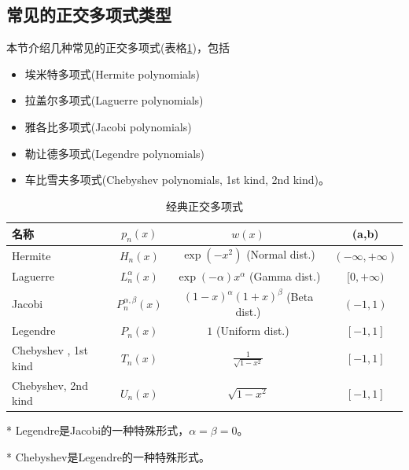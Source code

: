 \begin{subappendices}
\section{常见的正交多项式类型}
本节介绍几种常见的正交多项式(表格\ref{tab:poly-ortho-poly-classical})，包括
\begin{itemize}
  \item 埃米特多项式(Hermite polynomials)
  \item 拉盖尔多项式(Laguerre polynomials)
  \item 雅各比多项式(Jacobi polynomials)
  \item 勒让德多项式(Legendre polynomials)
  \item 车比雪夫多项式(Chebyshev polynomials, 1st kind, 2nd kind)。
\end{itemize}

\begin{table}[htbp]
\begin{center}
    \scriptsize
    \def\arraystretch{1.2}
    \centering
    \caption{经典正交多项式}
    \begin{threeparttable}
    \begin{tabular}{lccc}
        \hline
        名称 & $p_n(x)$ & $w(x)$ & (a,b) \\
        \hline
        Hermite & $H_n(x)$ & $\exp(-x^2)$ (Normal dist.) & $(-\infty, + \infty)$ \\
        Laguerre & $L_n^{\alpha}(x)$ & $\exp(-\alpha) x^{\alpha}$ (Gamma dist.)& $ [0, +\infty)$ \\
        Jacobi & $P_n^{\alpha,\beta}(x)$ & $(1-x)^{\alpha} (1+x)^{\beta}$ (Beta dist.) & $(-1,1)$ \\
        Legendre\tnote{*} & $P_n(x)$ & $1$ (Uniform dist.)& $[-1,1]$ \\
        Chebyshev\tnote{**} , 1st kind & $T_n(x)$ & $\frac{1}{\sqrt{1-x^2}}$ & $\left[ -1,1 \right]$ \\
        Chebyshev, 2nd kind & $U_n(x)$ & $\sqrt{1-x^2}$ & $\left[ -1,1 \right]$ \\
        \hline
    \end{tabular}
    \begin{tablenotes}
        \footnotesize
        \item[*] Legendre是Jacobi的一种特殊形式，$\alpha = \beta = 0$。
        \item[*] Chebyshev是Legendre的一种特殊形式。
    \end{tablenotes}
\end{threeparttable}
\end{center}
\label{tab:poly-ortho-poly-classical}
\end{table}



\end{subappendices}
